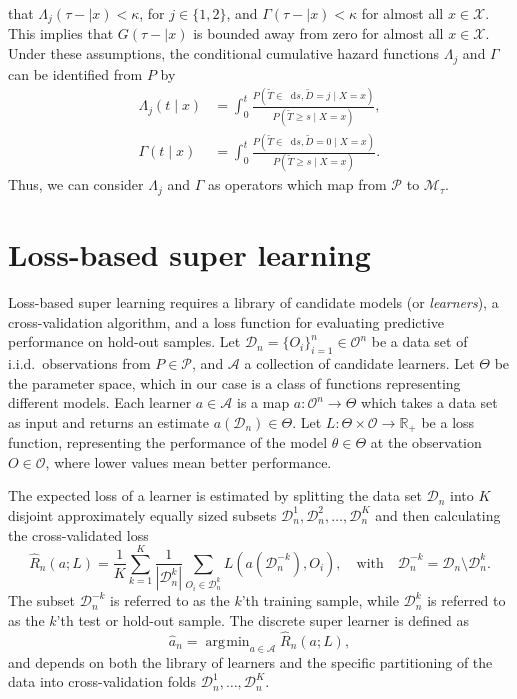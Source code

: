 \documentclass[lineno]{biometrika}
\newcommand{\R}{\mathbb{R}}
\newcommand*\diff{\mathop{}\!\mathrm{d}}
\newcommand{\1}{\mathds{1}}
\DeclareMathOperator*{\argmin}{\arg\!\min}
\newcommand{\data}{\ensuremath{\mathcal{D}}}
\begin{document}
that \(\Lambda_{j}(\tau- \mid x)<\kappa \), for \(j\in\{1,2\}\), and
\(\Gamma(\tau- \mid x)<\kappa\) for almost all \(x\in\mathcal
X\). This implies that \(G(\tau- \mid x)\) is bounded away
from zero for almost all \(x\in\mathcal X\).  Under these assumptions,
the conditional cumulative hazard functions \(\Lambda_{j}\) and
\(\Gamma\) can be identified from \(P\) by
\begin{align}
  \Lambda_{j}(t \mid x) &= \int_0^t\frac{  P(\tilde T \in \diff s, \tilde D=j \mid X=x )}{P(\tilde T \geq s \mid X=x )}, \label{eq:lambdaj}\\
  \Gamma(t \mid x) &= \int_0^t\frac{  P(\tilde T \in \diff s, \tilde D=0 \mid X=x )}{P(\tilde T \geq s \mid X=x )}\label{eq:gamma}.
\end{align}
Thus, we can consider $\Lambda_j$ and \(\Gamma\) as operators which map from
\( \mathcal{P} \) to \(\mathcal M_{\tau}\).

\section{Loss-based super learning}
\label{sec:super-learning}

Loss-based super learning requires a library of candidate models (or
\textit{learners}), a cross-validation algorithm, and a loss function
for evaluating predictive performance on hold-out samples. Let
\( \data_n=\{O_i\}_{i=1}^n \in \mathcal{O}^n \) be a data set of
i.i.d.\ observations from \( P \in \mathcal{P} \), and $\mathcal{A}$ a
collection of candidate learners. Let \(\Theta\) be the parameter
space, which in our case is a class of functions representing
different models. Each learner \(a \in \mathcal{A}\) is a map
\( a \colon \mathcal{O}^n \rightarrow \Theta \) which takes a data set
as input and returns an estimate $a(\data_n) \in \Theta$. Let
\(L\colon \Theta \times \mathcal{O} \rightarrow \R_+\) be a loss
function, representing the performance of the model
$\theta \in \Theta$ at the observation \( O \in \mathcal{O} \), where
lower values mean better performance.

The expected loss of a learner is estimated by splitting the data set
$\data_n$ into $K$ disjoint approximately equally sized subsets
\(\data_n^1, \data_n^2, \dots, \data_n^K \) and then calculating the
cross-validated loss
\begin{equation}
  \label{eq:cv-risk-est}
  \hat{R}_n(a; L) =
  \frac{1}{K}\sum_{k=1}^{K}
  \frac{1}{| \data_n^{k} |}\sum_{O_i \in \data_n^{k}}
  L
  {
    \left(
      a{ (\data_n^{-k})}
      , O_i
    \right)
  },
  \quad \text{with} \quad
  \data_n^{-k} = \data_n \setminus \data_n^{k}.
\end{equation}
The subset \(\data_n^{-k}\) is referred to as the \(k\)'th training
sample, while \(\data_n^{k}\) is referred to as the \(k\)'th test or
hold-out sample.
The discrete super learner is defined as
\begin{equation*}
\hat{a}_n = \argmin_{a\in\mathcal A}\hat{R}_n(a; L),
\end{equation*}
and depends on both the library of learners and the specific
partitioning of the data into cross-validation folds
\( \data_n^1, \dots, \data_n^K \).
\end{document}
